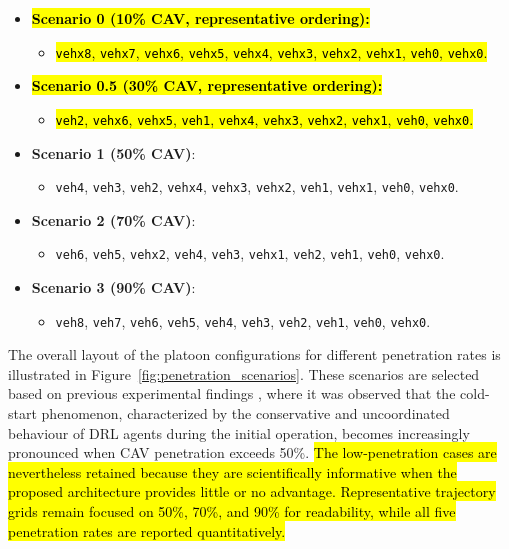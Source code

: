 \documentclass{ieeeaccess}
\begin{document}
\begin{itemize}
    \item \hl{\textbf{Scenario 0 (10\% CAV, representative ordering):}}
    \begin{itemize}
        \item \hl{\texttt{vehx8}, \texttt{vehx7}, \texttt{vehx6}, \texttt{vehx5}, \texttt{vehx4}, \texttt{vehx3}, \texttt{vehx2}, \texttt{vehx1}, \texttt{veh0}, \texttt{vehx0}.}
    \end{itemize}

    \item \hl{\textbf{Scenario 0.5 (30\% CAV, representative ordering):}}
    \begin{itemize}
        \item \hl{\texttt{veh2}, \texttt{vehx6}, \texttt{vehx5}, \texttt{veh1}, \texttt{vehx4}, \texttt{vehx3}, \texttt{vehx2}, \texttt{vehx1}, \texttt{veh0}, \texttt{vehx0}.}
    \end{itemize}

    \item \textbf{Scenario 1 (50\% CAV)}:
    \begin{itemize}
        \item \texttt{veh4}, \texttt{veh3}, \texttt{veh2}, \texttt{vehx4}, \texttt{vehx3}, \texttt{vehx2}, \texttt{veh1}, \texttt{vehx1}, \texttt{veh0}, \texttt{vehx0}.
    \end{itemize}

    \item \textbf{Scenario 2 (70\% CAV)}:
    \begin{itemize}
        \item \texttt{veh6}, \texttt{veh5}, \texttt{vehx2}, \texttt{veh4}, \texttt{veh3}, \texttt{vehx1}, \texttt{veh2}, \texttt{veh1}, \texttt{veh0}, \texttt{vehx0}.
    \end{itemize}

    \item \textbf{Scenario 3 (90\% CAV)}:
    \begin{itemize}
        \item \texttt{veh8}, \texttt{veh7}, \texttt{veh6}, \texttt{veh5}, \texttt{veh4}, \texttt{veh3}, \texttt{veh2}, \texttt{veh1}, \texttt{veh0}, \texttt{vehx0}.
    \end{itemize}
\end{itemize}

The overall layout of the platoon configurations for different penetration rates is illustrated in Figure~\ref{fig:penetration_scenarios}. These scenarios are selected based on previous experimental findings \cite{cai2024multi}, where it was observed that the cold-start phenomenon, characterized by the conservative and uncoordinated behaviour of DRL agents during the initial operation, becomes increasingly pronounced when CAV penetration exceeds 50\%. \hl{The low-penetration cases are nevertheless retained because they are scientifically informative when the proposed architecture provides little or no advantage. Representative trajectory grids remain focused on 50\%, 70\%, and 90\% for readability, while all five penetration rates are reported quantitatively.}
\end{document}
